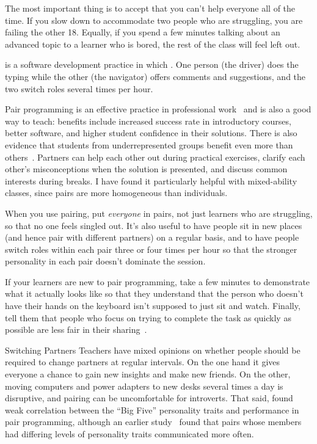 The most important thing is to accept that
you can't help everyone all of the time.
If you slow down to accommodate two people who are struggling,
you are failing the other 18.
Equally,
if you spend a few minutes talking about an advanced topic to a learner who is bored,
the rest of the class will feel left out.


 is a software development practice
in which .
One person (the driver) does the typing
while the other (the navigator) offers comments and suggestions,
and the two switch roles several times per hour.

Pair programming is an effective practice in professional work~\cite{Hann2009}
and is also a good way to teach:
benefits include increased success rate in introductory courses,
better software,
and higher student confidence in their solutions.
There is also evidence that students from underrepresented groups
benefit even more than others~\cite{McDo2006,Hank2011,Port2013,Cele2018}.
Partners can help each other out during practical exercises,
clarify each other's misconceptions when the solution is presented,
and discuss common interests during breaks.
I have found it particularly helpful with mixed-ability classes,
since pairs are more homogeneous than individuals.

When you use pairing,
put \emph{everyone} in pairs,
not just learners who are struggling,
so that no one feels singled out.
It's also useful to have people sit in new places
(and hence pair with different partners)
on a regular basis,
and to have people switch roles within each pair three or four times per hour
so that the stronger personality in each pair doesn't dominate the session.

If your learners are new to pair programming,
take a few minutes to demonstrate what it actually looks like
so that they understand that
the person who doesn't have their hands on the keyboard
isn't supposed to just sit and watch.
Finally,
tell them that people who focus on trying to complete the task as quickly as possible
are less fair in their sharing~\cite{Lewi2015}.

\begin{aside}{Switching Partners}
  Teachers have mixed opinions on whether people should be required to change partners at regular intervals.
  On the one hand it gives everyone a chance to gain new insights and make new friends.
  On the other,
  moving computers and power adapters to new desks several times a day is disruptive,
  and pairing can be uncomfortable for introverts.
  That said,
  \cite{Hann2010} found weak correlation between the ``Big Five'' personality traits
  and performance in pair programming,
  although an earlier study~\cite{Wall2009} found that
  pairs whose members had differing levels of personality traits communicated more often.
\end{aside}

